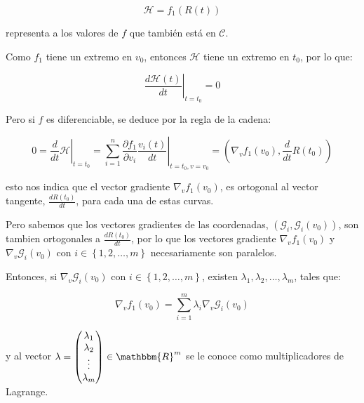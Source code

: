             \begin{equation}
                \mathscr{H} = f_1(R(t))
            \end{equation}

            representa a los valores de $f$  que también está en $\mathscr{C}$.

            Como $f_1$ tiene un extremo en $v_0$, entonces $\mathscr{H}$ tiene un extremo en $t_0$, por lo que:

            \begin{equation}
                \left. \frac{d \mathscr{H}(t)}{dt} \right|_{t=t_0} = 0
            \end{equation}

            Pero si $f$ es diferenciable, se deduce por la regla de la cadena:

            \begin{equation}
                0 = \left. \frac{d}{dt} \mathscr{H} \right|_{t=t_0} = \left. \sum_{i=1}^n \frac{\partial f_1}{\partial v_i} \frac{v_i(t)}{dt} \right|_{t=t_0, v=v_0} = \left( \nabla_v f_1(v_0), \frac{d}{dt} R(t_0) \right)
            \end{equation}

            esto nos indica que el vector gradiente $\nabla_v f_1(v_0)$, es ortogonal al vector tangente, $\frac{d R(t_0)}{dt}$, para cada una de estas curvas.

            Pero sabemos que los vectores gradientes de las coordenadas, $\left( \mathscr{G}_i, \mathscr{G}_i(v_0) \right)$, son tambien ortogonales a $\frac{d R(t_0)}{dt}$, por lo que los vectores gradiente $\nabla_v f_1(v_0)$ y $\nabla_v \mathscr{G}_i(v_0)$ con $i \in \left\{ 1, 2, \dots, m \right\}$ necesariamente son paralelos.

            Entonces, si $\nabla_v \mathscr{G}_i(v_0)$ con $i \in \left\{ 1, 2, \dots, m \right\}$, existen $\lambda_1, \lambda_2, \dots, \lambda_m$, tales que:

            \begin{equation}
                \nabla_v f_1(v_0) = \sum_{i=1}^m \lambda_i \nabla_v \mathscr{G}_i(v_0)
            \end{equation}

            y al vector $\lambda = \begin{pmatrix} \lambda_1 \\ \lambda_2 \\ \vdots \\ \lambda_m \end{pmatrix} \in \mathbbm{R}^m$ se le conoce como multiplicadores de Lagrange.

